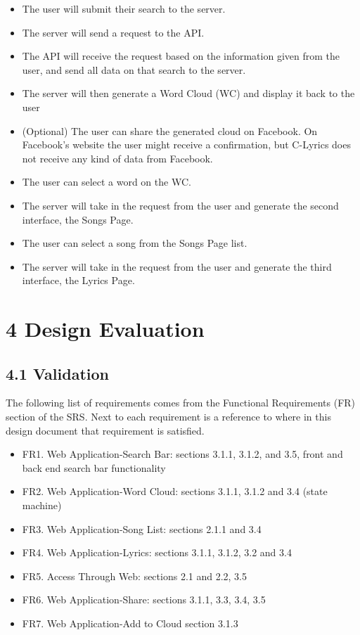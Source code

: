 \documentclass[]{article}
\begin{document}
\begin{itemize}
\itemsep1pt\parskip0pt
\item
  The user will submit their search to the server.
\item
  The server will send a request to the API.
\item
  The API will receive the request based on the information given from
  the user, and send all data on that search to the server.
\item
  The server will then generate a Word Cloud (WC) and display it back to
  the user
\item
  (Optional) The user can share the generated cloud on Facebook. On Facebook's website the user might receive a confirmation, but C-Lyrics does not receive any kind of data from Facebook.
\item
  The user can select a word on the WC.
\item
  The server will take in the request from the user and generate the
  second interface, the Songs Page.
\item
  The user can select a song from the Songs Page list.
\item
  The server will take in the request from the user and generate the
  third interface, the Lyrics Page.
\end{itemize}

\section{4 Design Evaluation}\label{design-evaluation}

\subsection{4.1 Validation}\label{validation}

The following list of requirements comes from the Functional
Requirements (FR) section of the SRS. Next to each requirement is a
reference to where in this design document that requirement is
satisfied.

\begin{itemize}
\itemsep1pt\parskip0pt
\item
  FR1. Web Application-Search Bar: sections 3.1.1, 3.1.2, and 3.5, front and
  back end search bar functionality
\item
  FR2. Web Application-Word Cloud: sections 3.1.1, 3.1.2 and 3.4 (state
  machine)
\item
  FR3. Web Application-Song List: sections 2.1.1 and 3.4
\item
  FR4. Web Application-Lyrics: sections 3.1.1, 3.1.2, 3.2 and 3.4
\item
  FR5. Access Through Web: sections 2.1 and 2.2, 3.5
\item
  FR6. Web Application-Share: sections 3.1.1, 3.3, 3.4, 3.5
\item
  FR7. Web Application-Add to Cloud section 3.1.3
\end{itemize}
\end{document}
